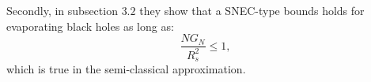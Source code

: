 \noindent Secondly, in subsection \(3.2\) they show that a SNEC-type bounds holds for evaporating black holes as long as:
\[
\frac{NG_N}{R_s^2} \le 1,     
\]
which is true in the semi-classical approximation.

	
	
	

	
	
	
	
	



